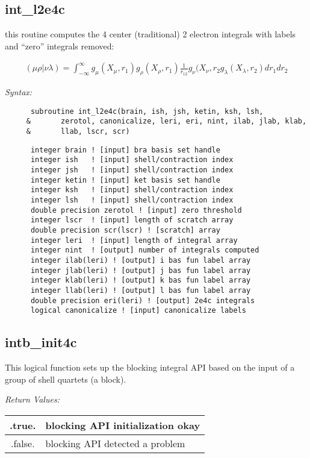 \subsection{int\_l2e4c} 
this routine computes the 4 center (traditional) 2 electron integrals 
with labels and ``zero'' integrals removed:  
 
\begin{eqnarray*} 
({\mu}{\rho}|{\nu}{\lambda}) = \int_{-\infty}^{\infty} g_{\mu}(X_{\mu},r_{1})g_{\rho}(X_{\rho},r_{1})\frac{1}{r_{12}}g_{\nu}
(X_{\nu},r_{2}g_{\lambda}(X_{\lambda},r_{2})dr_{1}dr_{2} 
\end{eqnarray*} 
 
{\it Syntax:} 
\begin{verbatim} 
      subroutine int_l2e4c(brain, ish, jsh, ketin, ksh, lsh, 
     &       zerotol, canonicalize, leri, eri, nint, ilab, jlab, klab, 
     &       llab, lscr, scr) 
\end{verbatim} 
\begin{verbatim} 
      integer brain ! [input] bra basis set handle 
      integer ish   ! [input] shell/contraction index 
      integer jsh   ! [input] shell/contraction index 
      integer ketin ! [input] ket basis set handle 
      integer ksh   ! [input] shell/contraction index 
      integer lsh   ! [input] shell/contraction index 
      double precision zerotol ! [input] zero threshold 
      integer lscr  ! [input] length of scratch array 
      double precision scr(lscr) ! [scratch] array 
      integer leri  ! [input] length of integral array 
      integer nint  ! [output] number of integrals computed 
      integer ilab(leri) ! [output] i bas fun label array  
      integer jlab(leri) ! [output] j bas fun label array  
      integer klab(leri) ! [output] k bas fun label array  
      integer llab(leri) ! [output] l bas fun label array  
      double precision eri(leri) ! [output] 2e4c integrals 
      logical canonicalize ! [input] canonicalize labels 
\end{verbatim} 
\subsection{intb\_init4c} 
This logical function sets up the blocking integral API based on the 
input of a group of shell quartets (a block).   
 
{\it Return Values:} 
\begin{tabular}{|c|p{60mm}|} \hline 
 .true.  & blocking API initialization okay\\ \hline 
 .false. & blocking API detected a problem \\ \hline 
\end{tabular} 
 
